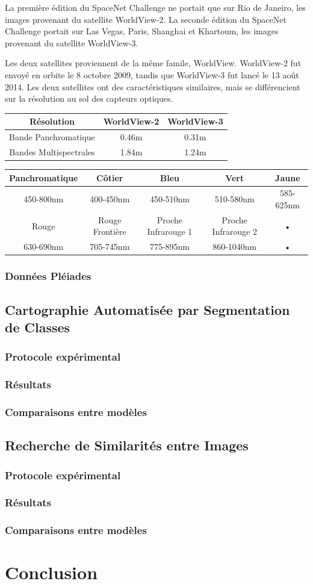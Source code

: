 \documentclass[a4paper, 10pt]{report}
\begin{document}
La première édition du SpaceNet Challenge ne portait que sur Rio de Janeiro, les images provenant du satellite WorldView-2.
La seconde édition du SpaceNet Challenge portait sur Las Vegas, Paris, Shanghai et Khartoum, les images provenant du satellite WorldView-3.

Les deux satellites proviennent de la même famile, WorldView. WorldView-2 fut envoyé en orbite le 8 octobre 2009, tandis que WorldView-3 fut lancé le 13 août 2014.
Les deux satellites ont des caractéristiques similaires, mais se différencient sur la résolution au sol des capteurs optiques.
\begin{center}
	\begin{tabular}{|c|c|c|}
	\hline 
	Résolution & WorldView-2 & WorldView-3 \\ 
	\hline 
	Bande Panchromatique & 0.46m & 0.31m \\ 
	\hline 
	Bandes Multispectrales & 1.84m & 1.24m \\ 
	\hline 
	\end{tabular} 
\end{center}

\begin{tabular}{|c|c|c|c|c|}
\hline 
Panchromatique & Côtier & Bleu & Vert & Jaune \\ 
\hline 
450-800nm & 400-450nm & 450-510nm & 510-580nm & 585-625nm \\ 
\hline 
Rouge & Rouge Frontière & Proche Infrarouge 1 & Proche Infrarouge 2 & • \\ 
\hline 
630-690nm & 705-745nm & 775-895nm & 860-1040nm & • \\ 
\hline 
\end{tabular} 
\subsection{Données Pléiades}
\section{Cartographie Automatisée par Segmentation de Classes}
\subsection{Protocole expérimental}
\subsection{Résultats}
\subsection{Comparaisons entre modèles}
\section{Recherche de Similarités entre Images}
\subsection{Protocole expérimental}
\subsection{Résultats}
\subsection{Comparaisons entre modèles}
\chapter{Conclusion}
\end{document}
